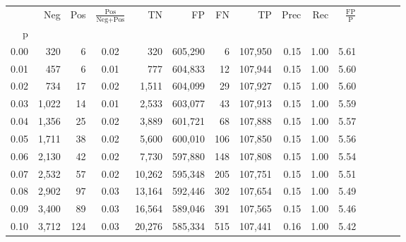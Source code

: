\begin{tabular}{rrrcrrrrrrrrrrr}
\toprule
{} &     Neg &    Pos & $\frac{\text{Pos}}{\text{Neg}+\text{Pos}}$ &       TN &       FP &       FN &       TP &  Prec &   Rec & $\frac{\text{FP}}{\text{P}}$ \\
p    &         &        &                                            &          &          &          &          &       &       &                              \\
\midrule
0.00 &     320 &      6 &                                       0.02 &      320 &  605,290 &        6 &  107,950 &  0.15 &  1.00 &                         5.61 \\
0.01 &     457 &      6 &                                       0.01 &      777 &  604,833 &       12 &  107,944 &  0.15 &  1.00 &                         5.60 \\
0.02 &     734 &     17 &                                       0.02 &    1,511 &  604,099 &       29 &  107,927 &  0.15 &  1.00 &                         5.60 \\
0.03 &   1,022 &     14 &                                       0.01 &    2,533 &  603,077 &       43 &  107,913 &  0.15 &  1.00 &                         5.59 \\
0.04 &   1,356 &     25 &                                       0.02 &    3,889 &  601,721 &       68 &  107,888 &  0.15 &  1.00 &                         5.57 \\
0.05 &   1,711 &     38 &                                       0.02 &    5,600 &  600,010 &      106 &  107,850 &  0.15 &  1.00 &                         5.56 \\
0.06 &   2,130 &     42 &                                       0.02 &    7,730 &  597,880 &      148 &  107,808 &  0.15 &  1.00 &                         5.54 \\
0.07 &   2,532 &     57 &                                       0.02 &   10,262 &  595,348 &      205 &  107,751 &  0.15 &  1.00 &                         5.51 \\
0.08 &   2,902 &     97 &                                       0.03 &   13,164 &  592,446 &      302 &  107,654 &  0.15 &  1.00 &                         5.49 \\
0.09 &   3,400 &     89 &                                       0.03 &   16,564 &  589,046 &      391 &  107,565 &  0.15 &  1.00 &                         5.46 \\
0.10 &   3,712 &    124 &                                       0.03 &   20,276 &  585,334 &      515 &  107,441 &  0.16 &  1.00 &                         5.42 \\

\end{tabular}
